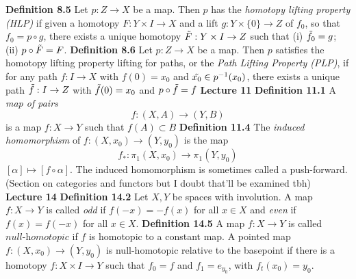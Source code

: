 \newline \newline \textbf{Definition 8.5} Let $p: Z \rightarrow X$ be a map. Then $p$ has the \textit{homotopy lifting property (HLP)} if given a homotopy $F: Y \times I \rightarrow X$ and a lift $g: Y \times \{0\} \rightarrow Z$ of $f_0$, so that $f_0 = p \circ g$, there exists a unique homotopy $\Tilde{F}: Y \times I \rightarrow Z$ such that
\newline \newline (i) $\Tilde{f}_0 = g$;
\newline \newline (ii) $p \circ \Tilde{F} = F$.
\newline \newline \textbf{Definition 8.6} Let $p: Z \rightarrow X$ be a map. Then $p$ satisfies the homotopy lifting property lifting for paths, or the \textit{Path Lifting Property (PLP)}, if for any path $f: I \rightarrow X$ with $f(0) = x_0$ and $\Tilde{x_0} \in p^{-1}(x_0)$, there exists a unique path $\Tilde{f}: I \rightarrow Z$ with $\Tilde{f}(0) = x_0$ and $p \circ \Tilde{f} = f$
\newline \newline \textbf{Lecture 11}
\newline \newline \textbf{Definition 11.1} A \textit{map of pairs} $$ f:(X,A) \rightarrow (Y,B)$$ is a map $f: X \rightarrow Y$ such that $f(A) \subset B$
\newline \newline \textbf{Definition 11.4} The \textit{induced homomorphism} of $f:(X, x_0) \rightarrow (Y, y_0)$ is the map $$f_*:\pi_1(X,x_0) \rightarrow \pi_1(Y, y_0)$$ $[\alpha] \mapsto [f \circ \alpha]$. \newline The induced homomorphism is sometimes called a push-forward.
\newline \newline (Section on categories and functors but I doubt that'll be examined tbh)
\newline \newline \textbf{Lecture 14}
\newline \newline \textbf{Definition 14.2} Let $X,Y$ be spaces with involution. A map $f:X \rightarrow Y$ is called \textit{odd} if $f(-x) = -f(x)$ for all $x \in X$ and \textit{even} if $f(x) = f(-x)$ for all $x \in X$.
\newline \newline \textbf{Definition 14.5} A map $f: X \rightarrow Y$ is called $\textit{null-homotopic}$ if $f$ is homotopic to a constant map. A pointed map $f:(X,x_0) \rightarrow (Y,y_0)$ is null-homotopic relative to the basepoint if there is a homotopy $f: X \times I \rightarrow Y$ such that $f_0 = f$ and $f_1 = e_{y_0}$, with $f_t(x_0) = y_0$.
